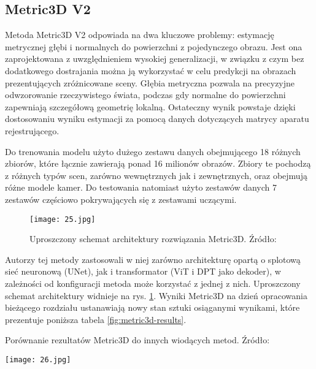 \subsection{Metric3D V2}
Metoda Metric3D V2 \cite{hu2024} odpowiada na dwa kluczowe problemy: estymację metrycznej głębi i normalnych do powierzchni z pojedynczego obrazu. Jest ona zaprojektowana z uwzględnieniem wysokiej generalizacji, w związku z czym bez dodatkowego dostrajania można ją wykorzystać w celu predykcji na obrazach prezentujących zróżnicowane sceny.
Głębia metryczna pozwala na precyzyjne odwzorowanie rzeczywistego świata, podczas gdy normalne do powierzchni zapewniają szczegółową geometrię lokalną. Ostateczny wynik powstaje dzięki dostosowaniu wyniku estymacji za pomocą danych dotyczących matrycy aparatu rejestrującego. 

Do trenowania modelu użyto dużego zestawu danych obejmującego 18 różnych zbiorów, które łącznie zawierają ponad 16 milionów obrazów. Zbiory te pochodzą z różnych typów scen, zarówno wewnętrznych jak i zewnętrznych, oraz obejmują różne modele kamer. Do testowania natomiast użyto zestawów danych 7 zestawów częściowo pokrywających się z zestawami uczącymi.

\begin{figure}[H]
    \centering
    \texttt{[image: 25.jpg]}
    \caption{Uproszczony schemat architektury rozwiązania Metric3D. Źródło: \cite{hu2024}}
    \label{fig:metric3d-schema}
\end{figure}

Autorzy tej metody zastosowali w niej zarówno architekturę opartą o splotową sieć neuronową (UNet), jak i transformator (ViT i DPT jako dekoder), w zależności od konfiguracji metoda może korzystać z jednej z nich. Uproszczony schemat architektury widnieje na rys. \ref{fig:metric3d-schema}. Wyniki Metric3D na dzień opracowania bieżącego rozdziału ustanawiają nowy stan sztuki osiąganymi wynikami, które prezentuje poniższa tabela \ref{fig:metric3d-results}.
\begin{table}[H]
    \centering
    \caption{Porównanie rezultatów Metric3D do innych wiodących metod. Źródło: \cite{hu2024}}
    \texttt{[image: 26.jpg]}
    \label{fig:metric3d-results}
\end{table}

